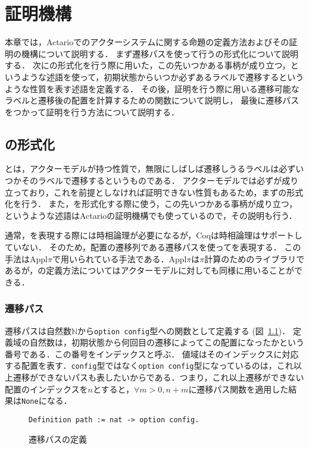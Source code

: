 \chapter{証明機構}
\label{chapter:proof}

本章では，Actarioでのアクターシステムに関する命題の定義方法およびその証明の機構について説明する．
まず遷移パスを使って行う\fairness の形式化について説明する．
次に\fairness の形式化を行う際に用いた，この先いつかある事柄が成り立つ，というような述語を使って，初期状態からいつか必ずあるラベルで遷移するというような性質を表す述語を定義する．
その後，証明を行う際に用いる遷移可能なラベルと遷移後の配置を計算するための関数について説明し，
最後に遷移パスをつかって証明を行う方法について説明する．

\section{\fairness の形式化}
\fairness とは，アクターモデルが持つ性質で，無限にしばしば遷移しうるラベルは必ずいつかそのラベルで遷移するというものである．
アクターモデルでは必ず\fairness が成り立っており，これを前提としなければ証明できない性質もあるため，まず\fairness の形式化を行う．
また，\fairness を形式化する際に使う，この先いつかある事柄が成り立つ，というような述語はActarioの証明機構でも使っているので，その説明も行う．

通常，\fairness を表現する際には時相論理が必要になるが，Coqは時相論理はサポートしていない．
そのため，配置の遷移列である遷移パスを使って\fairness を表現する．
この手法はAppl$\pi$\cite{}で用いられている手法である．Appl$\pi$は$\pi$計算のためのライブラリであるが，\fairness の定義方法についてはアクターモデルに対しても同様に用いることができる．

\subsection{遷移パス}
遷移パスは自然数$\mathbb{N}$から\texttt{option config}型への関数として定義する (図~\ref{code:formalization:path})．
定義域の自然数は，初期状態から何回目の遷移によってこの配置になったかという番号である．この番号をインデックスと呼ぶ．
値域はそのインデックスに対応する配置を表す．\texttt{config}型ではなく\texttt{option config}型になっているのは，これ以上遷移ができないパスも表したいからである．つまり，これ以上遷移ができない配置のインデックスを$n$とすると，$\forall m > 0, n + m$に遷移パス関数を適用した結果は\texttt{None}になる．

\begin{figure}[tp]
\begin{lstlisting}
Definition path := nat -> option config.
\end{lstlisting}
  \label{code:formalization:path}
  \caption{遷移パスの定義}
\end{figure}

